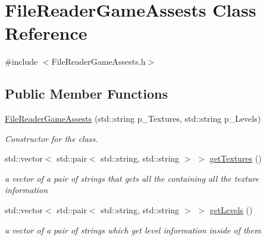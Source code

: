 \hypertarget{class_file_reader_game_assests}{}\section{File\+Reader\+Game\+Assests Class Reference}
\label{class_file_reader_game_assests}


{\ttfamily \#include $<$File\+Reader\+Game\+Assests.\+h$>$}

\subsection*{Public Member Functions}
\begin{DoxyCompactItemize}
\item 
\mbox{\label{class_file_reader_game_assests_ab30bee0c946988ceaa3e9ba6f8ecf190}} 
\mbox{\hyperlink{class_file_reader_game_assests_ab30bee0c946988ceaa3e9ba6f8ecf190}{File\+Reader\+Game\+Assests}} (std\+::string p\+\_\+\+Textures, std\+::string p\+\_\+\+Levels)
\begin{DoxyCompactList}\small\item\em Constructor for the class. \end{DoxyCompactList}\item 
std\+::vector$<$ std\+::pair$<$ std\+::string, std\+::string $>$ $>$ \mbox{\hyperlink{class_file_reader_game_assests_a952fd5fb0c4d71319af28483ef60ad84}{get\+Textures}} ()
\begin{DoxyCompactList}\small\item\em a vector of a pair of strings that gets all the containing all the texture information \end{DoxyCompactList}\item 
\mbox{\label{class_file_reader_game_assests_a3d89ce1322e0bfe0c104a055d662deac}} 
std\+::vector$<$ std\+::pair$<$ std\+::string, std\+::string $>$ $>$ \mbox{\hyperlink{class_file_reader_game_assests_a3d89ce1322e0bfe0c104a055d662deac}{get\+Levels}} ()
\begin{DoxyCompactList}\small\item\em a vector of a pair of strings which get level information inside of them \end{DoxyCompactList}\end{DoxyCompactItemize}

